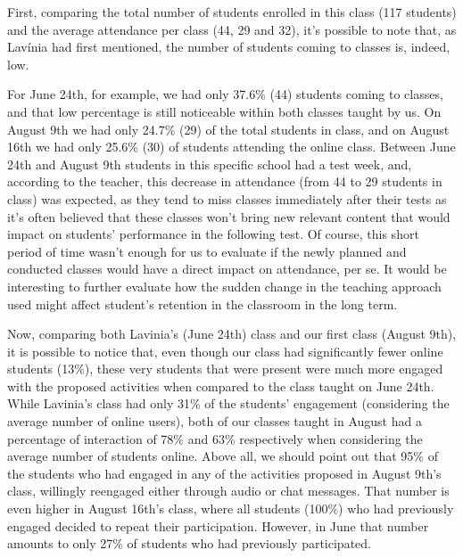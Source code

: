 \documentclass[english]{textolivre}
\begin{document}
First, comparing the total number of students enrolled in this class (117 students) and the average attendance per class (44, 29 and 32), it’s possible to note that, as Lavínia had first mentioned, the number of students coming to classes is, indeed, low. 

For June 24th, for example, we had only 37.6\% (44) students coming to classes, and that low percentage is still noticeable within both classes taught by us. On August 9th we had only 24.7\% (29) of the total students in class, and on August 16th we had only 25.6\% (30) of students attending the online class. Between June 24th and August 9th students in this specific school had a test week, and, according to the teacher, this decrease in attendance (from 44 to 29 students in class) was expected, as they tend to miss classes immediately after their tests as it’s often believed that these classes won’t bring new relevant content that would impact on students’ performance in the following test. Of course, this short period of time wasn’t enough for us to evaluate if the newly planned and conducted classes would have a direct impact on attendance, per se. It would be interesting to further evaluate how the sudden change in the teaching approach used might affect student’s retention in the classroom in the long term.

Now, comparing both Lavinia’s (June 24th) class and our first class (August 9th), it is possible to notice that, even though our class had significantly fewer online students (13\%), these very students that were present were much more engaged with the proposed activities when compared to the class taught on June 24th. While Lavinia’s class had only 31\% of the students’ engagement (considering the average number of online users), both of our classes taught in August had a percentage of interaction of 78\% and 63\% respectively when considering the average number of students online. Above all, we should point out that 95\% of the students who had engaged in any of the activities proposed in August 9th’s class, willingly reengaged either through audio or chat messages. That number is even higher in August 16th’s class, where all students (100\%) who had previously engaged decided to repeat their participation. However, in June that number amounts to only 27\% of students who had previously participated.
\end{document}
